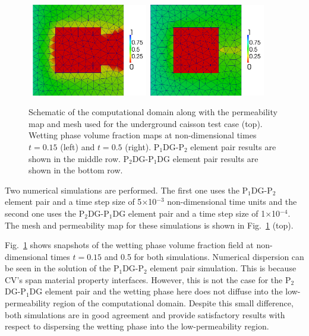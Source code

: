 \documentclass[preprint,authoryear,12pt]{elsarticle}
\newcommand{\PN}[2][error]{P$_{#1}$DG-P$_{#2}$}
\begin{document}
\begin{figure}[h!]
{    \hbox{
      \hspace{0.4cm}\includegraphics[width=0.45\textwidth]{dg_square_015_low}
      \hspace{0.4cm}\includegraphics[width=0.45\textwidth]{dg_square_05_low}}}
  \caption{Schematic of the computational domain along with the
    permeability map and mesh used for the underground caisson test
    case (top).  Wetting phase volume fraction maps at non-dimensional
    times $t=0.15$ (left) and $t=0.5$ (right). \PN[1]{2} element pair
    results are shown in the middle row. \PN[2]{1}DG element pair
    results are shown in the bottom row.
    \label{fig:square_permeability}}
\end{figure}

Two numerical simulations are performed. The first one uses the
\PN[1]{2} element pair and a time step size of 5$\times$10$^{-3}$
non-dimensional time units and the second one uses the \PN[2]{1}DG
element pair and a time step size of 1$\times$10$^{-4}$. The mesh and
permeability map for these simulations is shown in
Fig.~\ref{fig:square_permeability} (top).

Fig.~\ref{fig:square_permeability} shows snapshots of the wetting
phase volume fraction field at non-dimensional times $t = 0.15$ and
0.5 for both simulations.  Numerical dispersion can be seen in the
solution of the \PN[1]{2} element pair simulation. This is because
CV's span material property interfaces. However, this is not the case
for the \PN[2]{1}DG element pair and the wetting phase here does not
diffuse into the low-permeability region of the computational domain.
Despite this small difference, both simulations are in good agreement
and provide satisfactory results with respect to dispersing the
wetting phase into the low-permeability region.
\end{document}
